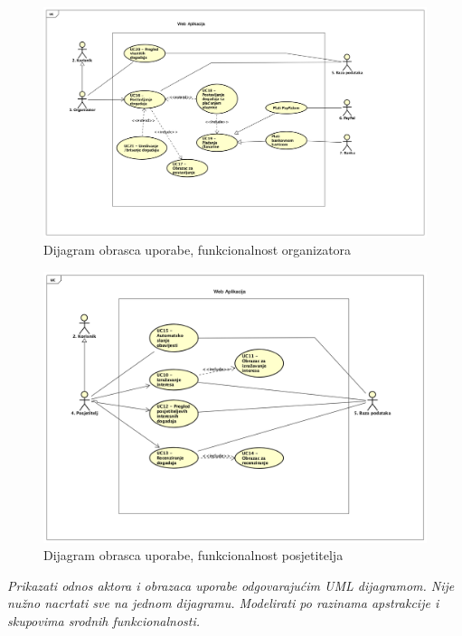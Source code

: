 					\begin{figure}[H]
						\includegraphics[scale=0.35]{dijagrami/Organizator_UC_dijagram.png} %
						\centering
						\caption{Dijagram obrasca uporabe, funkcionalnost organizatora}
						\label{fig:promjene}
					\end{figure}
					
					\begin{figure}[H]
						\includegraphics[scale=0.4]{dijagrami/Posjetitelj_UC_dijagram.png} %
						\centering
						\caption{Dijagram obrasca uporabe, funkcionalnost posjetitelja}
						\label{fig:promjene}
					\end{figure}
					
					
					\textit{Prikazati odnos aktora i obrazaca uporabe odgovarajućim UML dijagramom. Nije nužno nacrtati sve na jednom dijagramu. Modelirati po razinama apstrakcije i skupovima srodnih funkcionalnosti.}
				\eject		
				
